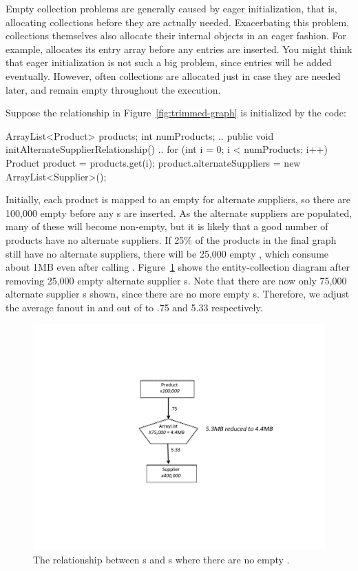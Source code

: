 Empty collection problems are generally caused by eager initialization, that is,
allocating collections before they are actually needed. Exacerbating this
problem, collections themselves also allocate their internal objects in an eager
fashion. For example,  allocates its entry array before any entries are inserted.
You might think that eager initialization is not such a big problem, since
entries will be added eventually. However, often collections are allocated
just in case they are needed later, and remain empty throughout the execution.

Suppose the relationship
in Figure~\ref{fig:trimmed-graph} is initialized by the code:
\begin{shortlisting}
ArrayList<Product> products;
int numProducts;
   ..
   public void initAlternateSupplierRelationship() {
       ..
       for (int i = 0; i < numProducts; i++) {
          Product product = products.get(i);
          product.alternateSuppliers = 
                           new ArrayList<Supplier>();
       }
   }
\end{shortlisting}
Initially, each product is mapped to an empty  for alternate
suppliers, so there are 100,000 empty  before any
s are inserted. As the alternate suppliers are populated, many
of these  will become non-empty, but it is likely that a good
number of products have no alternate suppliers. If 25\% of the products in the
final graph still have no alternate suppliers, there will be 25,000 empty
, which consume about 1MB even after calling
.
Figure~\ref{fig:empty-array} shows the entity-collection
diagram after removing 25,000 empty alternate supplier s. Note
that there are now only 75,000 alternate supplier s shown,
since there are no more empty s. Therefore, we adjust the
average fanout in and out of  to .75 and
5.33 respectively.
\begin{figure}
  \centering
 \includegraphics[width=.80\textwidth]{part1/Figures/collections/empty-product.pdf}
 \caption{The relationship between s and s
  where there are no empty .}
  \label{fig:empty-array}
\end{figure}
 
